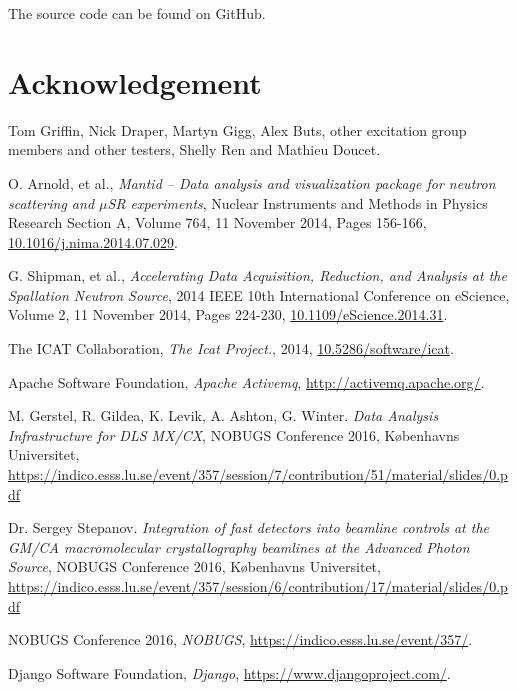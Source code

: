 \documentclass[twocolumn]{article}
\begin{document}
The source code can be found on GitHub\cite{source}.

\section{Acknowledgement}\label{Acknowledgement}

Tom Griffin, Nick Draper, Martyn Gigg, Alex Buts, other excitation group members and other testers, Shelly Ren and Mathieu Doucet.

\begin{thebibliography}{99}
    O. Arnold, et al.,
    \emph{Mantid -- Data analysis and visualization package for neutron scattering and $\mu$SR experiments},
    Nuclear Instruments and Methods in Physics Research Section A, Volume 764, 11 November 2014, Pages 156-166,
    \href{http://dx.doi.org/10.1016/j.nima.2014.07.029}{10.1016/j.nima.2014.07.029}.

    G. Shipman, et al.,
    \emph{Accelerating Data Acquisition, Reduction, and Analysis at the Spallation Neutron Source},
    2014 IEEE 10th International Conference on eScience, Volume 2, 11 November 2014, Pages 224-230,
    \href{http://dx.doi.org/10.1109/eScience.2014.31}{10.1109/eScience.2014.31}.
    
    The ICAT Collaboration,
    \emph{The Icat Project.},
    2014,
    \href{https://doi.org/10.5286/SOFTWARE/ICAT}{10.5286/software/icat}.
    
    Apache Software Foundation,
    \emph{Apache Activemq},
    \url{http://activemq.apache.org/}.

	M. Gerstel, R. Gildea, K. Levik, A. Ashton, G. Winter.
	\emph{Data Analysis Infrastructure for DLS MX/CX},
	NOBUGS Conference 2016, Københavns Universitet,
	\url{https://indico.esss.lu.se/event/357/session/7/contribution/51/material/slides/0.pdf}

	Dr. Sergey Stepanov.
	\emph{Integration of fast detectors into beamline controls at the GM/CA macromolecular crystallography beamlines at the Advanced Photon Source},
	NOBUGS Conference 2016, Københavns Universitet,
	\url{https://indico.esss.lu.se/event/357/session/6/contribution/17/material/slides/0.pdf}

	NOBUGS Conference 2016,
	\emph{NOBUGS},
	\url{https://indico.esss.lu.se/event/357/}.
    
    Django Software Foundation,
    \emph{Django},
    \url{https://www.djangoproject.com/}.
    

\end{thebibliography}
\end{document}
